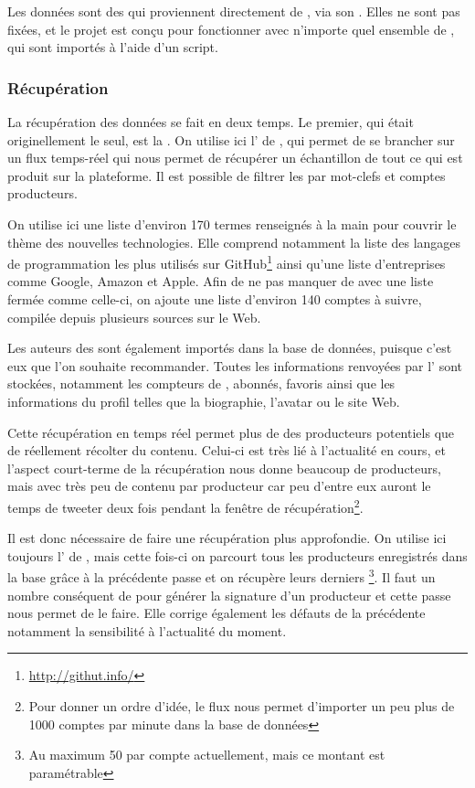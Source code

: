 Les données sont des \tweets{} qui proviennent directement de \twt{}, via son
\api{}. Elles ne sont pas fixées, et le projet est conçu pour fonctionner avec
n’importe quel ensemble de \tweets{}, qui sont importés à l’aide d’un script.

\subsubsection{Récupération}

La récupération des données se fait en deux temps. Le premier, qui était
originellement le seul, est la . On utilise ici l’\api{}
 de \twt{}, qui permet de se brancher sur un flux temps-réel qui
nous permet de récupérer un échantillon de tout ce qui est produit sur la
plateforme. Il est possible de filtrer les \tweets{} par mot-clefs et comptes
producteurs.

On utilise ici une liste d’environ 170 termes renseignés à la main pour couvrir
le thème des nouvelles technologies. Elle comprend notamment la liste des
langages de programmation les plus utilisés sur
GitHub\footnote{\url{http://githut.info/}} ainsi qu’une liste d’entreprises
comme Google, Amazon et Apple. Afin de ne pas manquer de \tweets{} avec une
liste fermée comme celle-ci, on ajoute une liste d’environ 140 comptes à
suivre, compilée depuis plusieurs sources sur le Web.

Les auteurs des \tweets{} sont également importés dans la base de données,
puisque c’est eux que l’on souhaite recommander. Toutes les informations
renvoyées par l’\api{} sont stockées, notamment les compteurs de \tweets{},
abonnés, favoris ainsi que les informations du profil telles que la biographie,
l’avatar ou le site Web.

Cette récupération en temps réel permet plus de  des producteurs
potentiels que de réellement récolter du contenu. Celui-ci est très lié à
l’actualité en cours, et l’aspect court-terme de la récupération nous donne
beaucoup de producteurs, mais avec très peu de contenu par producteur car peu
d’entre eux auront le temps de tweeter deux fois pendant la fenêtre de
récupération\footnote{Pour donner un ordre d’idée, le flux nous permet
d’importer un peu plus de 1000 comptes par minute dans la base de données}.

Il est donc nécessaire de faire une récupération plus approfondie. On utilise
ici toujours l’\api{} de \twt{}, mais cette fois-ci on parcourt tous les
producteurs enregistrés dans la base grâce à la précédente passe et on récupère
leurs derniers \tweets{}\footnote{Au maximum 50 par compte actuellement, mais
ce montant est paramétrable}. Il
faut un nombre conséquent de \tweets{} pour générer la signature d’un
producteur et cette passe nous permet de le faire. Elle corrige également les
défauts de la précédente notamment la sensibilité à l’actualité du moment.

